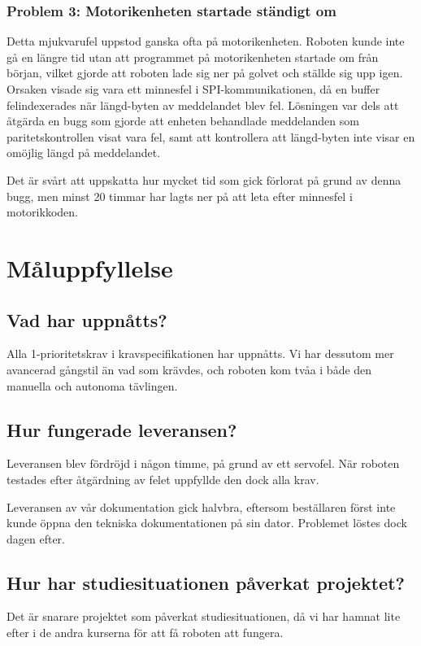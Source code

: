 \documentclass[a4paper,titlepage,12pt]{article}
\begin{document}
    \subsubsection{Problem 3: Motorikenheten startade ständigt om}

    Detta mjukvarufel uppstod ganska ofta på motorikenheten.
    Roboten kunde inte gå en längre tid utan att programmet på motorikenheten
    startade om från början, vilket gjorde att roboten lade sig ner på golvet
    och ställde sig upp igen. Orsaken visade sig vara ett minnesfel i
    SPI-kommunikationen, då en buffer felindexerades när längd-byten av
    meddelandet blev fel. Lösningen var dels att åtgärda en bugg som
    gjorde att enheten behandlade meddelanden som paritetskontrollen visat vara
    fel, samt att kontrollera att längd-byten inte visar en omöjlig längd på
    meddelandet.

    Det är svårt att uppskatta hur mycket tid som gick förlorat på grund av
    denna bugg, men minst 20 timmar har lagts ner på att leta efter minnesfel i
    motorikkoden.


	\section{Måluppfyllelse}
	
	\subsection{Vad har uppnåtts?}
    Alla 1-prioritetskrav i kravspecifikationen har uppnåtts. Vi har dessutom
    mer avancerad gångstil än vad som krävdes, och roboten kom tvåa i både den
    manuella och autonoma tävlingen.
	
	\subsection{Hur fungerade leveransen?}
    Leveransen blev fördröjd i någon timme, på grund av ett servofel. När
    roboten testades efter åtgärdning av felet uppfyllde den dock alla krav.

    Leveransen av vår dokumentation gick halvbra, eftersom beställaren först
    inte kunde öppna den tekniska dokumentationen på sin dator. Problemet
    löstes dock dagen efter.
	
	\subsection{Hur har studiesituationen påverkat projektet?}
    Det är snarare projektet som påverkat studiesituationen, då vi har hamnat
    lite efter i de andra kurserna för att få roboten att fungera.
	
\end{document}
